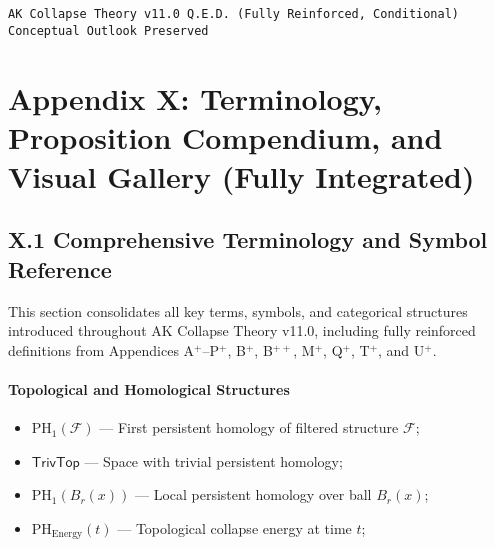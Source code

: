 \documentclass[11pt]{article}
\begin{document}
\begin{center}
\texttt{AK Collapse Theory v11.0 \quad Q.E.D. (Fully Reinforced, Conditional) \quad Conceptual Outlook Preserved}
\end{center}




\section*{Appendix X: Terminology, Proposition Compendium, and Visual Gallery (Fully Integrated)}

\subsection*{X.1 Comprehensive Terminology and Symbol Reference}

This section consolidates all key terms, symbols, and categorical structures introduced throughout AK Collapse Theory v11.0, including fully reinforced definitions from Appendices A$^{+}$–P$^{+}$, B$^{+}$, B$^{++}$, M$^{+}$, Q$^{+}$, T$^{+}$, and U$^{+}$.

\paragraph{Topological and Homological Structures}
\begin{itemize}
    \item $\mathrm{PH}_1(\mathcal{F})$ — First persistent homology of filtered structure $\mathcal{F}$;
    \item $\mathsf{TrivTop}$ — Space with trivial persistent homology;
    \item $\mathrm{PH}_1(B_r(x))$ — Local persistent homology over ball $B_r(x)$;
    \item $\mathrm{PH}_{\mathrm{Energy}}(t)$ — Topological collapse energy at time $t$;
\end{itemize}
\end{document}
